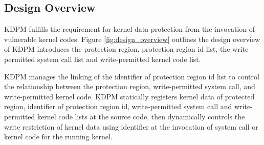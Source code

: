 



\subsection{Design Overview}

KDPM fulfills the requirement for kernel data protection from the invocation of
vulnerable kernel codes. 
%
Figure \ref{fig:design_overview} outlines the design overview of 
%
KDPM introduces the protection region, protection region id list, the
write-permitted system call list and write-permitted kernel code list.

%
KDPM manages the linking of the identifier of protection region id list to
control the relationship between the protection region, write-permitted system
call, and write-permitted kernel code.
%
KDPM statically registers kernel data of protected region, identifier of
protection region id, write-permitted system call and write-permitted kernel
code lists at the source code, then dynamically controls the write restriction
of kernel data using identifier at the invocation of system call or kernel code
for the running kernel.

